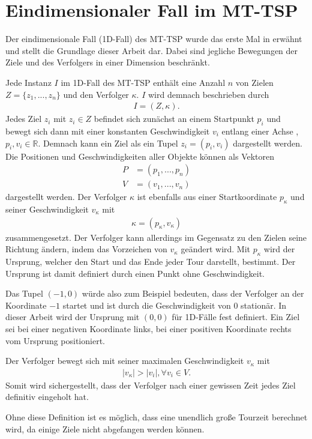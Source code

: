 \documentclass[german,version-2019-11]{uzl-thesis}
\begin{document}
\section{Eindimensionaler Fall im MT-TSP}
Der eindimensionale Fall (1D-Fall) des MT-TSP wurde das erste Mal in \cite{helvig} erwähnt und stellt die Grundlage dieser Arbeit dar. Dabei sind jegliche Bewegungen der Ziele und des Verfolgers in einer Dimension 
beschränkt.
\begin{definition} 
\label{def:Instanz}
Jede Instanz $I$ im 1D-Fall des MT-TSP enthält eine Anzahl $n$ von Zielen $Z = \{z_1,...,z_n\}$ und den Verfolger $\kappa$. $I$ wird demnach beschrieben durch
\begin{align*}
I = (Z, \kappa).
\end{align*}
Jedes Ziel $z_i$ mit $z_i\in Z$ befindet sich zunächst an einem Startpunkt $p_i$ und bewegt sich dann mit einer konstanten Geschwindigkeit $v_i$ entlang einer Achse , $p_i, v_i \in\mathbb{R}$. Demnach kann ein Ziel als ein Tupel $z_i = (p_i, v_i)$ dargestellt werden. Die Positionen und Geschwindigkeiten aller Objekte können als Vektoren
\begin{align*}
P &= (p_1, ..., p_n)\\
V &= (v_1, ..., v_n)
\end{align*}\noindent
dargestellt werden. Der Verfolger $\kappa$ ist ebenfalls aus einer Startkoordinate $p_{\kappa}$ und seiner Geschwindigkeit $v_{\kappa}$ mit
\begin{align*}
\kappa = (p_\kappa,v_\kappa)
\end{align*} \noindent
zusammengesetzt. Der Verfolger kann allerdings im Gegensatz zu den Zielen seine Richtung ändern, indem das Vorzeichen von $v_\kappa$ geändert wird. Mit $p_\kappa$ wird der Ursprung, welcher den Start und das Ende jeder Tour darstellt, bestimmt. Der Ursprung ist damit definiert durch einen Punkt ohne Geschwindigkeit.
\end{definition}\noindent
Das Tupel $(-1,0)$ würde also zum Beispiel bedeuten, dass der Verfolger an der Koordinate $-1$ startet und ist durch die Geschwindigkeit von $0$ stationär. In dieser Arbeit wird der Ursprung mit $(0,0)$ für 1D-Fälle fest definiert. Ein Ziel sei bei einer negativen Koordinate links, bei einer positiven Koordinate rechts vom Ursprung positioniert.

\begin{definition}
Der Verfolger bewegt sich mit seiner maximalen Geschwindigkeit $v_{\kappa}$ mit
\begin{align*}
|v_{\kappa}| > |v_i|, \forall v_i\in V.
\end{align*}
Somit wird sichergestellt, dass der Verfolger nach einer gewissen Zeit jedes Ziel definitiv eingeholt hat.
\end{definition} \noindent
Ohne diese Definition ist es möglich, dass eine unendlich große Tourzeit berechnet wird, da einige Ziele nicht abgefangen werden können.
\end{document}
